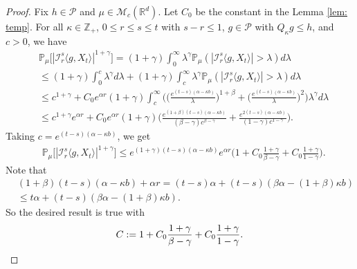 \documentclass[12pt,a4paper]{amsart}
\theoremstyle{plain}
\theoremstyle{definition}
\numberwithin{equation}{section}
\begin{document}
\begin{proof}
    Fix $h \in \mathcal P$ and $\mu \in \mathcal M_c(\mathbb R^d)$. Let $C_0$ be the constant in the Lemma \ref{lem: temp}.
    For all $\kappa \in \mathbb Z_+$,  $0\leq r\leq s\leq t$ with $s-r \leq 1$,  $g\in \mathcal P$ with $Q_{\kappa} g \leq h$, and $c>0$, we have
\begin{equation}\begin{split}
    &\mathbb P_\mu\big[|\mathcal I_r^s\langle g, X_t\rangle|^{1+\gamma}\big]
    = (1+\gamma)\int_0^\infty \lambda^{\gamma} \mathbb P_{\mu}(|\mathcal I_r^s\langle g, X_t\rangle|>\lambda) d\lambda
    \\&\leq (1+\gamma)\int_0^c \lambda^{\gamma} d\lambda +(1+\gamma)\int_c^\infty \lambda^{\gamma}\mathbb P_\mu(|\mathcal I_r^s\langle g, X_t\rangle|> \lambda) d\lambda
    \\& \leq c^{1+\gamma} + C_0  e^{\alpha r}(1+\gamma)\int_c^\infty \bigg(\Big(\frac{e^{(t-s)(\alpha - \kappa b)}}{\lambda}\Big)^{1+\beta}+\Big(\frac{e^{(t-s)(\alpha - \kappa b)}}{\lambda}\Big)^{2}\bigg)\lambda^{\gamma}d\lambda
    \\&\leq c^{1+\gamma} e^{\alpha r} + C_0e^{\alpha r}(1+\gamma)\Big(  \frac{e^{(1+\beta)(t-s)(\alpha- \kappa b)}}{(\beta - \gamma)c^{\beta - \gamma}}  + \frac{e^{2(t-s)(\alpha- \kappa b)}}{(1 - \gamma)c^{1 - \gamma}} \Big).
\end{split}\end{equation}
    Taking $c = e^{(t-s)(\alpha- \kappa b)}$, we get
\begin{equation}\begin{split}
    &\mathbb P_\mu\big[|\mathcal I_r^s\langle g, X_t\rangle|^{1+\gamma}\big]
    \leq e^{(1+\gamma)(t-s)(\alpha- \kappa b)} e^{\alpha r}\Big(1+ C_0 \frac{1+\gamma}{\beta - \gamma}+ C_0 \frac{1+\gamma}{1 - \gamma}\Big).
\end{split}\end{equation}
    Note that
\begin{equation}\begin{split}
    &(1+\beta)(t-s)(\alpha- \kappa b) + \alpha r
    = (t-s)\alpha+(t-s) (\beta\alpha- (1+\beta)\kappa b)
    \\&\leq t\alpha+(t-s) (\beta\alpha- (1+\beta)\kappa b).
\end{split}\end{equation}
    So the desired result is true with
\[
    C 
    := 1+ C_0 \frac{1+\gamma}{\beta - \gamma}+ C_0 \frac{1+\gamma}{1 - \gamma}.
    \qedhere
\]
\end{proof}
\end{document}
